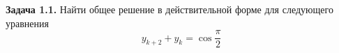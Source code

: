 \textbf{Задача 1.1.} Найти общее решение в действительной форме
для следующего уравнения
\[y_{k+2}+y_k=\cos{\frac{\pi}{2}}\]

